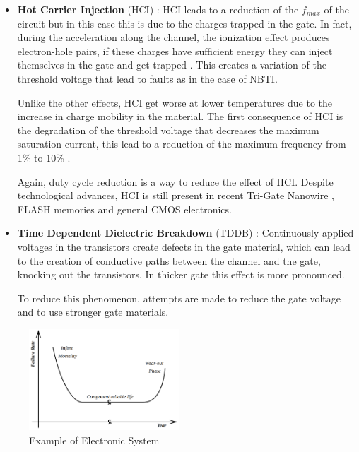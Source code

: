 {{{\begin{itemize}
				To reduce the contribution of this effect are used Dynamic Voltage Scaling and the power gating .
				
				\item \textbf{Hot Carrier Injection} (HCI) : HCI leads to a reduction of the $f_{max}$ of the circuit but in this case  this is due to the charges trapped in the gate. In fact, during the acceleration along the channel, the ionization effect produces electron-hole pairs, if these charges have sufficient energy they can inject themselves in the gate and get trapped . This creates a variation of the threshold voltage that lead to faults as in the case of NBTI.
				
				Unlike the other effects, HCI get worse at lower temperatures due to the increase in charge mobility in the material. The first consequence of HCI is the degradation of the threshold voltage that decreases the maximum saturation current, this lead to a reduction of the maximum frequency from 1\% to 10\% .
				
				Again, duty cycle reduction is a way to reduce the effect of HCI. Despite technological advances, HCI is still present in recent Tri-Gate Nanowire , FLASH memories  and general CMOS electronics.
				
				\item \textbf{Time Dependent Dielectric Breakdown} (TDDB) : Continuously applied voltages in the transistors create defects in the gate material, which can lead to the creation of conductive paths between the channel and the gate, knocking out the transistors. In thicker gate this effect is more pronounced.
				
				To reduce this phenomenon, attempts are made to reduce the gate voltage and to use stronger gate materials.
				
			\end{itemize}
			
			
			\begin{figure}
				\includegraphics[width=0.5\textwidth]{./images/ComponentLife.png}
				\caption{Example of Electronic System}
				\label{fig:ComponentLife}
			\end{figure} 
		
}}}
